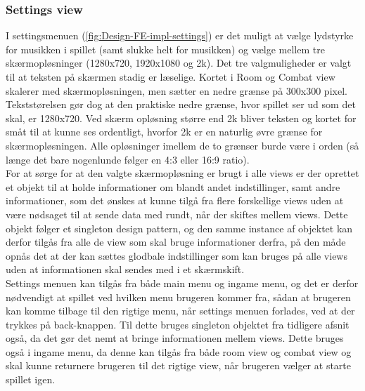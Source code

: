 \subsubsection{Settings view}

I settingsmenuen (\autoref{fig:Design-FE-impl-settings}) er det muligt at vælge lydstyrke for musikken i spillet (samt slukke helt for musikken) og vælge mellem tre skærmopløsninger (1280x720, 1920x1080 og 2k). Det tre valgmuligheder er valgt til at teksten på skærmen stadig er læselige. Kortet i Room og Combat view skalerer med skærmopløsningen, men sætter en nedre grænse på 300x300 pixel. Tekststørelsen gør dog at den praktiske nedre grænse, hvor spillet ser ud som det skal, er 1280x720. Ved skærm opløsning større end 2k bliver teksten og kortet for småt til at kunne ses ordentligt, hvorfor 2k er en naturlig øvre grænse for skærmopløsningen. Alle opløsninger imellem de to grænser burde være i orden (så længe det bare nogenlunde følger en 4:3 eller 16:9 ratio).\\

\noindent For at sørge for at den valgte skærmopløsning er brugt i alle views er der oprettet et objekt til at holde informationer om blandt andet indstillinger, samt andre informationer, som det ønskes at kunne tilgå fra flere forskellige views uden at være nødsaget til at sende data med rundt, når der skiftes mellem views. Dette objekt følger et singleton design pattern, og den samme instance af objektet kan derfor tilgås fra alle de view som skal bruge informationer derfra, på den måde opnås det at der kan sættes glodbale indstillinger som kan bruges på alle views uden at informationen skal sendes med i et skærmskift.\\

\noindent
Settings menuen kan tilgås fra både main menu og ingame menu, og det er derfor nødvendigt at spillet ved hvilken menu brugeren kommer fra, sådan at brugeren kan komme tilbage til den rigtige menu, når settings menuen forlades, ved at der trykkes på back-knappen. Til dette bruges singleton objektet fra tidligere afsnit også, da det gør det nemt at bringe informationen mellem views. Dette bruges også i ingame menu, da denne kan tilgås fra både room view og combat view og skal kunne returnere brugeren til det rigtige view, når brugeren vælger at starte spillet igen.


